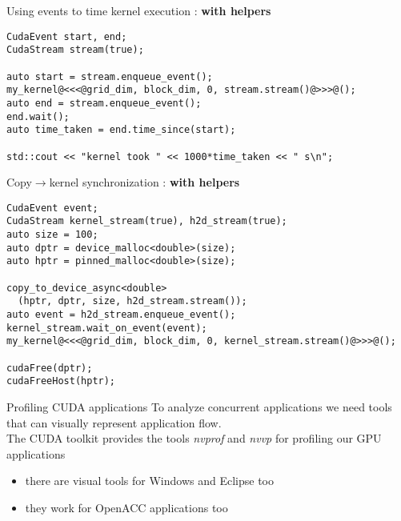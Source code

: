\begin{frame}[fragile]{}
    \begin{code}{Using events to time kernel execution : \textbf{with helpers}}
        \begin{lstlisting}[style=boxcudatiny]
CudaEvent start, end;
CudaStream stream(true);

auto start = stream.enqueue_event();
my_kernel@<<<@grid_dim, block_dim, 0, stream.stream()@>>>@();
auto end = stream.enqueue_event();
end.wait();
auto time_taken = end.time_since(start);

std::cout << "kernel took " << 1000*time_taken << " s\n";
        \end{lstlisting}
    \end{code}
    \begin{code}{Copy$\rightarrow$kernel synchronization : \textbf{with helpers}}
        \begin{lstlisting}[style=boxcudatiny]
CudaEvent event;
CudaStream kernel_stream(true), h2d_stream(true);
auto size = 100;
auto dptr = device_malloc<double>(size);
auto hptr = pinned_malloc<double>(size);

copy_to_device_async<double>
  (hptr, dptr, size, h2d_stream.stream());
auto event = h2d_stream.enqueue_event();
kernel_stream.wait_on_event(event);
my_kernel@<<<@grid_dim, block_dim, 0, kernel_stream.stream()@>>>@();

cudaFree(dptr);
cudaFreeHost(hptr);
        \end{lstlisting}
    \end{code}
\end{frame}

\begin{frame}[fragile]{}
    \begin{info}{Profiling CUDA applications}
        To analyze concurrent applications we need tools that can visually represent application flow.
        \\
        The CUDA toolkit provides the tools \emph{nvprof} and \emph{nvvp} for profiling our GPU applications
        \begin{itemize}
            \item there are visual tools for Windows and Eclipse too
            \item they work for OpenACC applications too
        \end{itemize}
    \end{info}

\end{frame}

